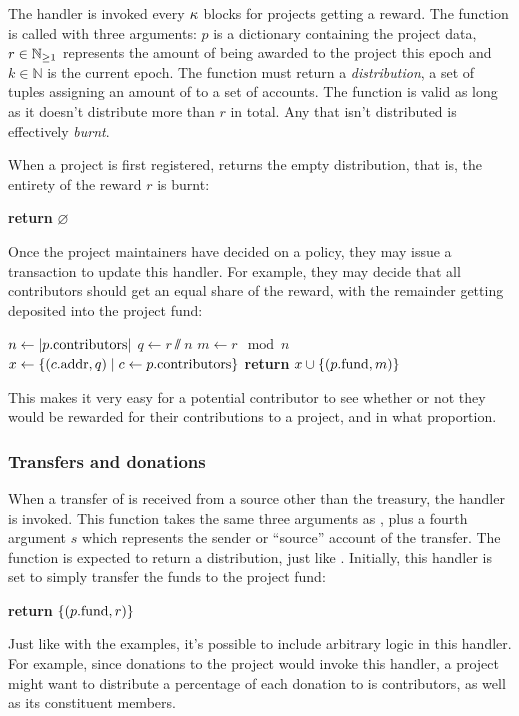 The  handler is invoked every $\kappa$ blocks for
projects getting a reward. The function is called with three arguments: $p$ is
a dictionary containing the project data, $r \in \mathbb{N}_{\geq 1}$ represents the amount
of \oscoin{} being awarded to the project this epoch and $k \in \mathbb{N}$ is the
current epoch. The function must return a \emph{distribution}, a set of tuples
assigning an amount of \oscoin{} to a set of accounts. The function is valid
as long as it doesn't distribute more than $r$ \oscoin{} in total. Any \oscoin{}
that isn't distributed is effectively \emph{burnt}.

When a project is first registered,  returns the empty
distribution, that is, the entirety of the reward $r$ is burnt:
\begin{algorithmic}[0]
        \State \textbf{return} $\varnothing$
    \EndProcedure
\end{algorithmic}

\noindent Once the project maintainers have decided on a policy, they may issue a
transaction to update this handler. For example, they may decide that all
contributors should get an equal share of the reward, with the remainder
getting deposited into the project fund:

\begin{algorithmic}[0]
        \State $n \gets |p.{\mathrm{contributors}}|$
        \State $q \gets r \sslash n$
        \State $m \gets r \mod n$
        \State $x \gets \{ (c.{\mathrm{addr}}, q) \mid c \gets p.{\mathrm{contributors}} \}$
        \State \textbf{return} $x \cup \{ (p.{\mathrm{fund}}, m) \}$
    \EndProcedure
\end{algorithmic}
This makes it very easy for a potential contributor to see whether or not they
would be rewarded for their contributions to a project, and in what proportion.

\subsubsection{Transfers and donations}

When a transfer of \oscoin{} is received from a source other than the treasury,
the  handler is invoked. This function takes the same
three arguments as , plus a fourth argument $s$ which
represents the sender or ``source'' account of the transfer. The function is
expected to return a distribution, just like . Initially,
this handler is set to simply transfer the funds to the project fund:
\medskip
\begin{algorithmic}[0]
        \State \textbf{return} $\{ (p.{\mathrm{fund}}, r) \}$
    \EndProcedure
\end{algorithmic}
Just like with the  examples, it's possible to include
arbitrary logic in this handler. For example, since donations to the project
would invoke this handler, a project might want to distribute a percentage
of each donation to is contributors, as well as its constituent members.

